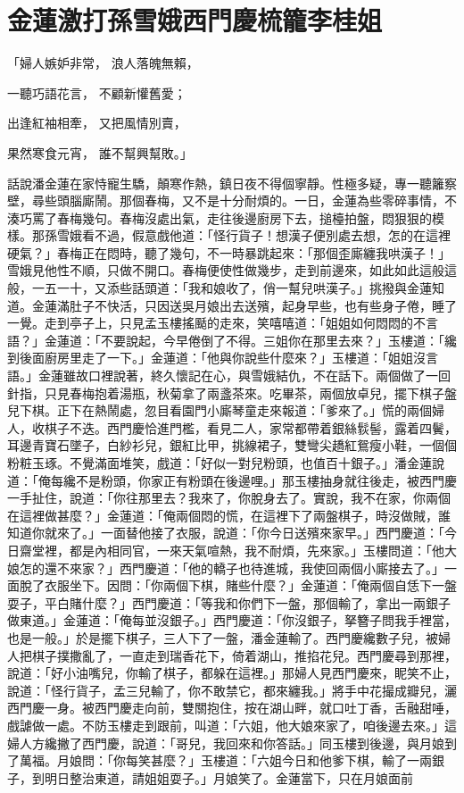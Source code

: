 %

\chapter{金蓮激打孫雪娥\KG 西門慶梳籠李桂姐}

「婦人嫉妒非常，  浪人落魄無賴，

一聽巧語花言，  不顧新懽舊愛；

出逢紅袖相牽，  又把風情別賣，

果然寒食元宵，  誰不幫興幫敗。」

話說潘金蓮在家恃寵生驕，顛寒作熱，鎮日夜不得個寧靜。性極多疑，專一聽籬察壁，尋些頭腦廝鬧。那個春梅，又不是十分耐煩的。一日，金蓮為些零碎事情，不湊巧罵了春梅幾句。春梅沒處出氣，走往後邊廚房下去，搥檯拍盤，悶狠狠的模樣。那孫雪娥看不過，假意戲他道：「怪行貨子！想漢子便別處去想，怎的在這裡硬氣？」春梅正在悶時，聽了幾句，不一時暴跳起來：「那個歪廝纏我哄漢子！」雪娥見他性不順，只做不開口。春梅便使性做幾步，走到前邊來，如此如此這般這般，一五一十，又添些話頭道：「我和娘收了，俏一幫兒哄漢子。」挑撥與金蓮知道。金蓮滿肚子不快活，只因送吳月娘出去送殯，起身早些，也有些身子倦，睡了一覺。走到亭子上，只見孟玉樓搖颳的走來，笑嘻嘻道：「姐姐如何悶悶的不言語？」金蓮道：「不要說起，今早倦倒了不得。三姐你在那里去來？」玉樓道：「纔到後面廚房里走了一下。」金蓮道：「他與你說些什麼來？」玉樓道：「姐姐沒言語。」金蓮雖故口裡說著，終久懷記在心，與雪娥結仇，不在話下。兩個做了一回針指，只見春梅抱着湯瓶，秋菊拿了兩盞茶來。吃畢茶，兩個放卓兒，擺下棋子盤兒下棋。正下在熱鬧處，忽目看園門小廝琴童走來報道：「爹來了。」慌的兩個婦人，收棋子不迭。西門慶恰進門檻，看見二人，家常都帶着銀絲䯼髻，露着四鬢，耳邊青寶石墜子，白紗衫兒，銀紅比甲，挑線裙子，雙彎尖趫紅鴛瘦小鞋，一個個粉粧玉琢。不覺滿面堆笑，戲道：「好似一對兒粉頭，也值百十銀子。」潘金蓮說道：「俺每纔不是粉頭，你家正有粉頭在後邊哩。」那玉樓抽身就往後走，被西門慶一手扯住，說道：「你往那里去？我來了，你脫身去了。實說，我不在家，你兩個在這裡做甚麼？」金蓮道：「俺兩個悶的慌，在這裡下了兩盤棋子，時沒做賊，誰知道你就來了。」一面替他接了衣服，說道：「你今日送殯來家早。」西門慶道：「今日齋堂裡，都是內相同官，一來天氣喧熱，我不耐煩，先來家。」玉樓問道：「他大娘怎的還不來家？」西門慶道：「他的轎子也待進城，我使回兩個小廝接去了。」一面脫了衣服坐下。因問：「你兩個下棋，賭些什麼？」金蓮道：「俺兩個自恁下一盤耍子，平白賭什麼？」西門慶道：「等我和你們下一盤，那個輸了，拿出一兩銀子做東道。」金蓮道：「俺每並沒銀子。」西門慶道：「你沒銀子，拏簪子問我手裡當，也是一般。」於是擺下棋子，三人下了一盤，潘金蓮輸了。西門慶纔數子兒，被婦人把棋子撲撒亂了，一直走到瑞香花下，倚着湖山，推掐花兒。西門慶尋到那裡，說道：「好小油嘴兒，你輸了棋子，都躲在這裡。」那婦人見西門慶來，眤笑不止，說道：「怪行貨子，孟三兒輸了，你不敢禁它，都來纏我。」將手中花撮成瓣兒，灑西門慶一身。被西門慶走向前，雙關抱住，按在湖山畔，就口吐丁香，舌融甜唾，戲謔做一處。不防玉樓走到跟前，叫道：「六姐，他大娘來家了，咱後邊去來。」這婦人方纔撇了西門慶，說道：「哥兒，我回來和你答話。」同玉樓到後邊，與月娘到了萬福。月娘問：「你每笑甚麼？」玉樓道：「六姐今日和他爹下棋，輸了一兩銀子，到明日整治東道，請姐姐耍子。」月娘笑了。金蓮當下，只在月娘面前